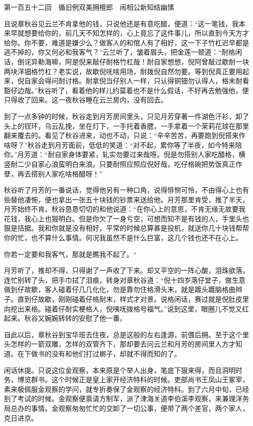 \documentclass[12pt,UTF8]{ctexbook}
\begin{document}
{{{第一百五十二回　循旧例双美拥檀郎　闹相公新知结幽愫





且说章秋谷见云兰不肯拿他的钱，只说他还是有意吃醋，便道：“这一笔钱，我本来早就想要给你的，前几天不知怎样的，心上竟忘了这件事儿，所以直到今天方才给你。你不要，难道是嫌少么？做客人的和倌人有了相好，这一下子竹杠迟早都是逃不掉的，你又何必和我客气？”云兰听了，皱着眉头，把金莲一顿道：“耐格闲话，倒诧异勒海嘛，阿是倪来敲仔耐格竹杠哉！耐自家想想，倪阿曾敲过歇耐一块两块洋钿格竹杠？老实说，故歇倪呒啥用场，耐拨倪自然勿要。等到倪真正要用起来，倪自家会得问耐讨格。耐拿倪当仔别人一样，只认得铜钿勿认得人，格末耐看豁仔边哉。”秋谷听了，看着他的样儿约莫着也不是什么假话，不好再去勉强他，便只得收了回来。这一夜秋谷睡在云兰房内，没有回去。

到了一点多钟的时候，秋谷走到月芳房间里头，只见月芳穿著一件湖色汗衫，卸了头上的钗环，乌云乱挽，坐在灯下，一手托着香腮，一手拿着一个茉莉花球在那里翻来覆去的。看见了秋谷进来，动也不动，只说：“辛辛苦苦，再要跑到倪搭来作啥呀？”秋谷走到月芳面前，低低的笑道：“对不起，累你等了半夜，如今特来陪你。”月芳道：“耐自家身体要紧，轧实勿要过来哉呀。倪是勿搭别人家吃醋格，横竖耐二少自家心浪蛮明白来浪。只要耐照应照应倪好哉，吃仔格碗把势饭真正作孽，再去搭别人家吃啥格醋呀！”

秋谷听了月芳的一番说话，觉得他另有一种口角，说得悱恻可怜，不由得心上也有些替他凄惋，便也拿出一张五十块钱的钞票来送给他。月芳那里肯受，推了半天，月芳始终不肯。秋谷恳恳切切的和他说道：“在你心上的意思，不肯无缘无故要我花钱，我心上也狠明白。但是你欠了一身亏空，可想而知不是有钱的人，手里头也狠是拮据。我和你就是没有相好，平常的时候总算甚是投机，就送你几十块钱帮帮你的忙，也不算什么事情。何况我虽然不是什么巨富，这几个钱也还不在心上。

你若一定要和我客气，那就是瞧我不起了。“

月芳听了，推却不得，只得谢了一声收了下来。却又平空的一阵心酸，泪珠欲落，连忙别转了头，把手巾拭了泪痕，转身对章秋谷道：“倪十四岁落仔堂子，做生意做到仔故歇，客人碰着仔几几化化，勿是靠勿住格滑头末，就是踱头踱脑格曲辫子。直到仔故歇，刚刚碰着仔格耐末，样式才对景。说格闲话，赛过就是倪肚皮里向挖出来格。碰着仔耐实梗格人，倪咦呒拨格号福气。”说到这里，眼圈儿不觉又红起来。秋谷又婉婉转转的安慰了他一番。

自此以后，章秋谷到宝华班去住夜，总是这般的左右逢源，前偎后拥。至于这个里头怎样的一箭双雕，怎样的双管齐下，那却要去问云兰和月芳的房间里人方才知道。在下做书的没有和他们打过梆子，却就不得而知的了。

闲话休提。只说这位金观察，本来原是个举人出身，笔底下狠来得，而且洞明时务，博览群书。这个时候正是皇上家开经济特科的时候。吏部尚书王凤山王冢宰，素来极佩服金观察的学问，就专折奏保了金观察的经济特科。到了六月中旬，已经到了考试的时候。金观察便禀请方制军，派了津海关道李伯溪李观察，来兼理洋务局总办的事情。金观察匆匆忙忙的交卸了一切公事，便带了两个差官，两个家人，克日进京。

}}}
\end{document}
